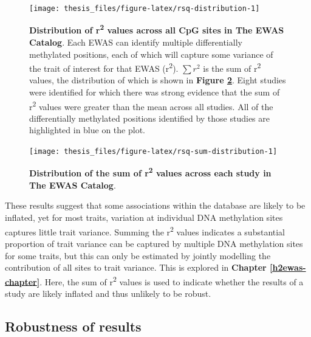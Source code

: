\documentclass[11pt,oneside]{bristolthesis}
\begin{document}
\begin{figure}

{\centering \texttt{[image: thesis\_files/figure-latex/rsq-distribution-1]} 

}

\caption[Distribution of r\textsuperscript{2} values across all CpG sites in The EWAS Catalog]{\textbf{Distribution of r\textsuperscript{2} values across all CpG sites in The EWAS Catalog}. Each EWAS can identify multiple differentially methylated positions, each of which will capture some variance of the trait of interest for that EWAS (r\textsuperscript{2}). \(\sum {r^2}\) is the sum of r\textsuperscript{2} values, the distribution of which is shown in \textbf{Figure \ref{fig:rsq-sum-distribution}}. Eight studies were identified for which there was strong evidence that the sum of r\textsuperscript{2} values were greater than the mean across all studies. All of the differentially methylated positions identified by those studies are highlighted in blue on the plot.}\label{fig:rsq-distribution}
\end{figure}



\begin{figure}

{\centering \texttt{[image: thesis\_files/figure-latex/rsq-sum-distribution-1]} 

}

\caption[Distribution of the sum of r\textsuperscript{2} values across each study in The EWAS Catalog]{\textbf{Distribution of the sum of r\textsuperscript{2} values across each study in The EWAS Catalog}.}\label{fig:rsq-sum-distribution}
\end{figure}
These results suggest that some associations within the database are likely to be inflated, yet for most traits, variation at individual DNA methylation sites captures little trait variance. Summing the r\textsuperscript{2} values indicates a substantial proportion of trait variance can be captured by multiple DNA methylation sites for some traits, but this can only be estimated by jointly modelling the contribution of all sites to trait variance. This is explored in \textbf{Chapter \ref{h2ewas-chapter}}. Here, the sum of r\textsuperscript{2} values is used to indicate whether the results of a study are likely inflated and thus unlikely to be robust.

\hypertarget{robustness-of-results}{%
\subsection{Robustness of results}\label{robustness-of-results}}
\end{document}
